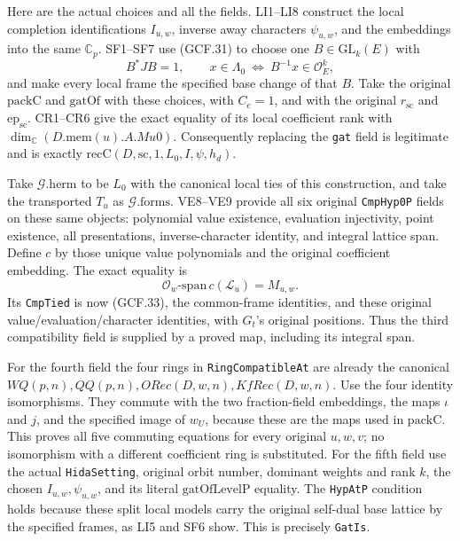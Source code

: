 \documentclass[11pt,a4paper]{article}
\numberwithin{equation}{section}
\theoremstyle{remark}\newtheorem{remark}[theorem]{Remark}
\begin{document}
Here are the actual choices and all the fields.  LI1--LI8 construct
the local completion identifications \(I_{u,w}\), inverse away
characters \(\psi_{u,w}\), and the embeddings into the same
\(\mathbb C_p\).  SF1--SF7 use (GCF.31) to choose one
\(B\in\mathrm{GL}_k(E)\) with
\[
 B^*JB=1,\qquad
 x\in\Lambda_0\ \Longleftrightarrow\ B^{-1}x\in\mathcal O_E^k,
 \tag{GCF.33}
\]
and make every local frame the specified base change of that \(B\).
Take the original \(\mathrm{packC}\) and \(\mathrm{gatOf}\)
with these choices, with \(C_e=1\), and with the original
\(r_{\mathrm{sc}}\) and \(\mathrm{ep}_{\mathrm{sc}}\).
CR1--CR6 give the exact equality of its local coefficient rank
with \(\dim_{\mathbb C}(D.\mathrm{mem}(u).A.Mu0)\).
Consequently replacing the \texttt{gat} field is legitimate and is
exactly \(\mathrm{recC}(D,\mathrm{sc},1,L_0,I,\psi,h_d)\).

Take \(\mathcal G.\mathrm{herm}\) to be \(L_0\) with the
canonical local ties of this construction, and take the transported
\(T_u\) as \(\mathcal G.\mathrm{forms}\).  VE8--VE9 provide all
six original \texttt{Cmp\allowbreak Hyp0P} fields on these same objects:
polynomial value existence, evaluation injectivity, point existence,
all presentations, inverse-character identity, and integral lattice
span.  Define \(c\) by those unique value polynomials and the
original coefficient embedding.  The exact equality is
\[
                \mathcal O_w\text{-span}\,c(\mathcal L_u)=M_{u,w}.
 \tag{GCF.34}
\]
Its \texttt{Cmp\allowbreak Tied} is now (GCF.33), the common-frame identities,
and these original value/evaluation/character identities, with
\(G_t\)'s original positions.  Thus the third compatibility field
is supplied by a proved map, including its integral span.

For the fourth field the four rings in
\texttt{Ring\allowbreak Compatible\allowbreak At} are already the canonical
\(WQ(p,n),QQ(p,n),ORec(D,w,n),KfRec(D,w,n)\).
Use the four identity isomorphisms.  They commute with the two
fraction-field embeddings, the maps \(\iota\) and \(j\), and the
specified image of \(w_U\), because these are the maps used in
\(\mathrm{packC}\).  This proves all five commuting equations
for every original \(u,w,v\); no isomorphism with a different
coefficient ring is substituted.  For the fifth field use the actual
\texttt{Hida\allowbreak Setting}, original orbit number, dominant weights and
rank \(k\), the chosen \(I_{u,w},\psi_{u,w}\), and its literal
\(\mathrm{gatOfLevelP}\) equality.  The \texttt{Hyp\allowbreak At\allowbreak P} condition
holds because these split local models carry the original self-dual
base lattice by the specified frames, as LI5 and SF6 show.
This is precisely \texttt{Gat\allowbreak Is}.
\end{document}
